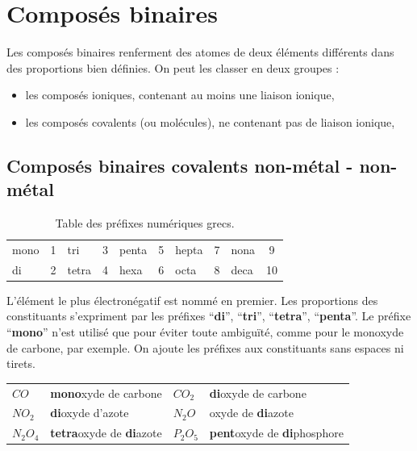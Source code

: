 \documentclass[
  11pt,
  a4paper,
  openany]{book}
\providecommand{\tightlist}{%
  \setlength{\itemsep}{0pt}\setlength{\parskip}{0pt}}
\begin{document}
\hypertarget{composuxe9s-binaires}{%
\section{Composés binaires}\label{composuxe9s-binaires}}

Les composés binaires renferment des atomes de deux éléments différents dans des proportions bien définies. On peut les classer en deux groupes :

\begin{itemize}
\tightlist
\item
  les composés ioniques, contenant au moins une liaison ionique,
\item
  les composés covalents (ou molécules), ne contenant pas de liaison ionique,
\end{itemize}

\hypertarget{composuxe9s-binaires-covalents-non-muxe9tal---non-muxe9tal}{%
\subsection{Composés binaires covalents \textbar{} non-métal - non-métal}\label{composuxe9s-binaires-covalents-non-muxe9tal---non-muxe9tal}}

\begin{longtable}[]{@{}lclclclclc@{}}
\caption{\label{tab:prefixes-numeriques-grecs} Table des préfixes numériques grecs.}\tabularnewline
\toprule()
\endhead
mono & 1 & tri & 3 & penta & 5 & hepta & 7 & nona & 9 \\
di & 2 & tetra & 4 & hexa & 6 & octa & 8 & deca & 10 \\
\bottomrule()
\end{longtable}

L'élément le plus électronégatif est nommé en premier. Les proportions des constituants s'expriment par les préfixes ``\textbf{di}'', ``\textbf{tri}'', ``\textbf{tetra}'', ``\textbf{penta}''. Le préfixe ``\textbf{mono}'' n'est utilisé que pour éviter toute ambiguïté, comme pour le monoxyde de carbone, par exemple. On ajoute les préfixes aux constituants sans espaces ni tirets.

\begin{longtable}[]{@{}
  >{\centering\arraybackslash}p{}
  >{\raggedright\arraybackslash}p{}
  >{\centering\arraybackslash}p{}
  >{\raggedright\arraybackslash}p{}@{}}
\toprule()
\endhead
\(CO\) & \textbf{mono}xyde de carbone & \(CO_2\) & \textbf{di}oxyde de carbone \\
\(NO_2\) & \textbf{di}oxyde d'azote & \(N_2O\) & oxyde de \textbf{di}azote \\
\(N_2O_4\) & \textbf{tetra}oxyde de \textbf{di}azote & \(P_2O_5\) & \textbf{pent}oxyde de \textbf{di}phosphore \\
\bottomrule()
\end{longtable}
\end{document}
